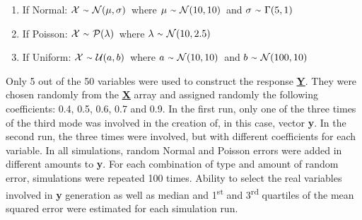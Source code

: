 \vspace{15pt}
\begin{enumerate}
    \item If Normal: $\mathcal{X}\ {\raise.17ex\hbox{$\scriptstyle\sim$}}\ \mathcal{N}(\mu, \sigma)$\ where $\mu\ {\raise.17ex\hbox{$\scriptstyle\sim$}}\ \mathcal{N}(10, 10)$\ and $\sigma\ {\raise.17ex\hbox{$\scriptstyle\sim$}}\ \Gamma(5, 1)$
    \item If Poisson: $\mathcal{X}\ {\raise.17ex\hbox{$\scriptstyle\sim$}}\ \mathcal{P}(\lambda)$\ where $\lambda\ {\raise.17ex\hbox{$\scriptstyle\sim$}}\ \mathcal{N}(10, 2.5)$
    \item If Uniform: $\mathcal{X}\ {\raise.17ex\hbox{$\scriptstyle\sim$}}\ \mathcal{U}(a, b)$\ where $a\ {\raise.17ex\hbox{$\scriptstyle\sim$}}\ \mathcal{N}(10, 10)$\ and $b\ {\raise.17ex\hbox{$\scriptstyle\sim$}}\ \mathcal{N}(100, 10)$
\end{enumerate}
\vspace{10pt}
Only 5 out of the 50 variables were used to construct the response \textbf{\underline{Y}}. They were chosen randomly from the \textbf{\underline{X}} array and assigned randomly the following coefficients: 0.4, 0.5, 0.6, 0.7 and 0.9. In the first run, only one of the three times of the third mode was involved in the creation of, in this case, vector \textbf{y}. In the second run, the three times were involved, but with different coefficients for each variable. In all simulations, random Normal and Poisson errors were added in different amounts to \textbf{y}. For each combination of type and amount of random error, simulations were repeated 100 times. Ability to select the real variables involved in \textbf{y} generation as well as median and 1\textsuperscript{st} and 3\textsuperscript{rd} quartiles of the mean squared error were estimated for each simulation run.

